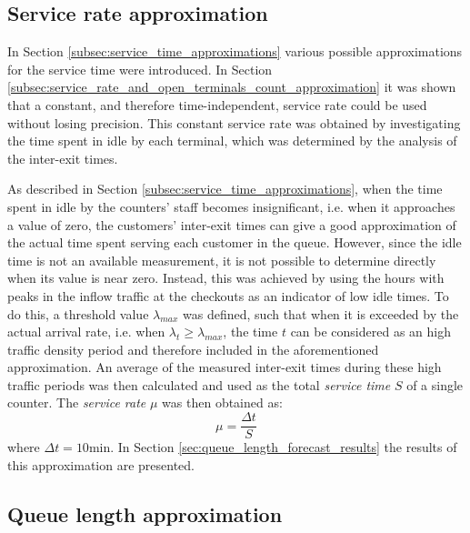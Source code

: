 \subsection{Service rate approximation}
\label{subsec:service_rate_approximation}

In Section \ref{subsec:service_time_approximations} various possible approximations for the service time were introduced. In Section \ref{subsec:service_rate_and_open_terminals_count_approximation} it was shown that a constant, and therefore time-independent, service rate could be used without losing precision. This constant service rate was obtained by investigating the time spent in idle by each terminal, which was determined by the analysis of the inter-exit times.

As described in Section \ref{subsec:service_time_approximations}, when the time spent in idle by the counters’ staff becomes insignificant, i.e. when it approaches a value of zero, the customers’ inter-exit times can give a good approximation of the actual time spent serving each customer in the queue. However, since the idle time is not an available measurement, it is not possible to determine directly when its value is near zero. Instead, this was achieved by using the hours with peaks in the inflow traffic at the checkouts as an indicator of low idle times. To do this, a threshold value \( \lambda_{max} \) was defined, such that when it is exceeded by the actual arrival rate, i.e. when \( \lambda_t \ge \lambda_{max} \), the time \( t \) can be considered as an high traffic density period and therefore included in the aforementioned approximation. An average of the measured inter-exit times during these high traffic periods was then calculated and used as the total \emph{service time} \( S \) of a single counter. The \emph{service rate} \( \mu \) was then obtained as:
\begin{equation}
  \mu = \frac{\Delta t}{S}
\end{equation}
where \( \Delta t = 10\text{min} \). In Section \ref{sec:queue_length_forecast_results} the results of this approximation are presented.

\subsection{Queue length approximation}
\label{subsec:queue_length_approximation}


